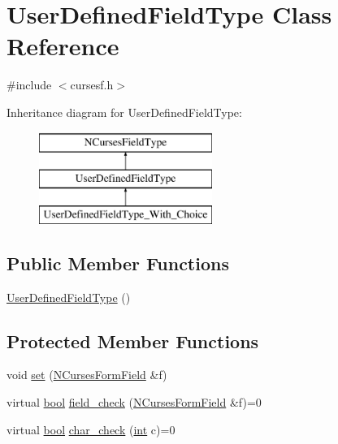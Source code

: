 \hypertarget{class_user_defined_field_type}{\section{User\-Defined\-Field\-Type Class Reference}
\label{class_user_defined_field_type}
}


{\ttfamily \#include $<$cursesf.\-h$>$}

Inheritance diagram for User\-Defined\-Field\-Type\-:\begin{figure}[H]
\begin{center}
\leavevmode
\includegraphics[height=3.000000cm]{class_user_defined_field_type}
\end{center}
\end{figure}
\subsection*{Public Member Functions}
\begin{DoxyCompactItemize}
\item 
\hyperlink{class_user_defined_field_type_a8e39c525f0909723a3f0dc516b6a26fa}{User\-Defined\-Field\-Type} ()
\end{DoxyCompactItemize}
\subsection*{Protected Member Functions}
\begin{DoxyCompactItemize}
\item 
void \hyperlink{class_user_defined_field_type_ae7b9a1003401089db6bde8b0bbbbb189}{set} (\hyperlink{class_n_curses_form_field}{N\-Curses\-Form\-Field} \&f)
\item 
virtual \hyperlink{term__entry_8h_a002004ba5d663f149f6c38064926abac}{bool} \hyperlink{class_user_defined_field_type_a62aba42ff1561eeb1c545fcd68030aef}{field\-\_\-check} (\hyperlink{class_n_curses_form_field}{N\-Curses\-Form\-Field} \&f)=0
\item 
virtual \hyperlink{term__entry_8h_a002004ba5d663f149f6c38064926abac}{bool} \hyperlink{class_user_defined_field_type_a044bf16e8dc960a6725f02296f51769e}{char\-\_\-check} (\hyperlink{term__entry_8h_ad65b480f8c8270356b45a9890f6499ae}{int} c)=0
\end{DoxyCompactItemize}
